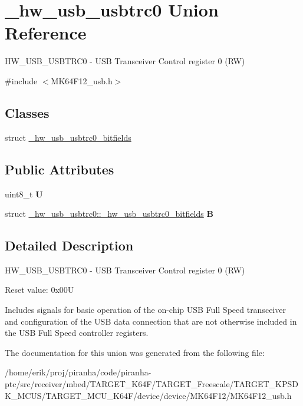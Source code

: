 \hypertarget{union__hw__usb__usbtrc0}{}\section{\+\_\+hw\+\_\+usb\+\_\+usbtrc0 Union Reference}
\label{union__hw__usb__usbtrc0}


H\+W\+\_\+\+U\+S\+B\+\_\+\+U\+S\+B\+T\+R\+C0 -\/ U\+SB Transceiver Control register 0 (RW)  




{\ttfamily \#include $<$M\+K64\+F12\+\_\+usb.\+h$>$}

\subsection*{Classes}
\begin{DoxyCompactItemize}
\item 
struct \hyperlink{struct__hw__usb__usbtrc0_1_1__hw__usb__usbtrc0__bitfields}{\+\_\+hw\+\_\+usb\+\_\+usbtrc0\+\_\+bitfields}
\end{DoxyCompactItemize}
\subsection*{Public Attributes}
\begin{DoxyCompactItemize}
\item 
uint8\+\_\+t {\bfseries U}\hypertarget{union__hw__usb__usbtrc0_a8fd48fd83b4f0e3ac157ea447ce78806}{}\label{union__hw__usb__usbtrc0_a8fd48fd83b4f0e3ac157ea447ce78806}

\item 
struct \hyperlink{struct__hw__usb__usbtrc0_1_1__hw__usb__usbtrc0__bitfields}{\+\_\+hw\+\_\+usb\+\_\+usbtrc0\+::\+\_\+hw\+\_\+usb\+\_\+usbtrc0\+\_\+bitfields} {\bfseries B}\hypertarget{union__hw__usb__usbtrc0_a565727bc4e9267990b054bacca6c5748}{}\label{union__hw__usb__usbtrc0_a565727bc4e9267990b054bacca6c5748}

\end{DoxyCompactItemize}


\subsection{Detailed Description}
H\+W\+\_\+\+U\+S\+B\+\_\+\+U\+S\+B\+T\+R\+C0 -\/ U\+SB Transceiver Control register 0 (RW) 

Reset value\+: 0x00U

Includes signals for basic operation of the on-\/chip U\+SB Full Speed transceiver and configuration of the U\+SB data connection that are not otherwise included in the U\+SB Full Speed controller registers. 

The documentation for this union was generated from the following file\+:\begin{DoxyCompactItemize}
\item 
/home/erik/proj/piranha/code/piranha-\/ptc/src/receiver/mbed/\+T\+A\+R\+G\+E\+T\+\_\+\+K64\+F/\+T\+A\+R\+G\+E\+T\+\_\+\+Freescale/\+T\+A\+R\+G\+E\+T\+\_\+\+K\+P\+S\+D\+K\+\_\+\+M\+C\+U\+S/\+T\+A\+R\+G\+E\+T\+\_\+\+M\+C\+U\+\_\+\+K64\+F/device/device/\+M\+K64\+F12/M\+K64\+F12\+\_\+usb.\+h\end{DoxyCompactItemize}
